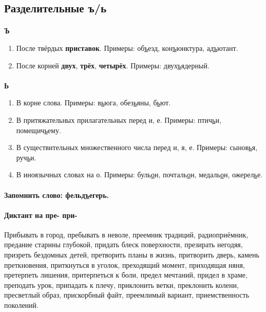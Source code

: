 \documentclass{article}
\begin{document}
\subsection{Разделительные ъ/ь}

\paragraph{}
\textbf{Ъ}

\begin{enumerate}
\item
  После твёрдых \textbf{приставок}. Примеры: об\underline{ъ}езд, кон\underline{ъ}юнктура,
  ад\underline{ъ}ютант.
\item
  После корней \textbf{двух}, \textbf{трёх}, \textbf{четырёх}. Примеры: двух\underline{ъ}ядерный.
\end{enumerate}

\paragraph{}
\textbf{Ь}
\begin{enumerate}
\item
  В корне слова. Примеры: в\underline{ь}юга, обез\underline{ь}яны, б\underline{ь}ют.
\item
  В притяжательных прилагательных перед и, е. Примеры: птич\underline{ь}и, помещич\underline{ь}ему.
\item
  В существительных множественного числа перед и, я, е. Примеры: сынов\underline{ь}я, руч\underline{ь}и.
\item
  В иноязычных словах на о. Примеры: буль\underline{о}н, почталь\underline{о}н, медаль\underline{о}н,
  ожерел\underline{ь}е.
\end{enumerate}

\paragraph{Запомнить слово: фельд\underline{ъ}егерь.}

\paragraph{Диктант на пре- при-} Прибывать в город, пребывать в неволе, преемник традиций, радиоприёмник,
предание старины глубокой, придать блеск поверхности, презирать негодяя, призреть бездомных детей, претворить
планы в жизнь, притворить дверь, камень преткновения, приткнуться в уголок, преходящий момент, приходящая няня,
претерпеть лишения, притерпеться к боли, предел мечтаний, придел в храме, преподать урок, припадать к плечу,
приклонить ветки, преклонить колени, пресветлый образ, прискорбный файт, преемлимый вариант,
приемственность поколений.
\end{document}

